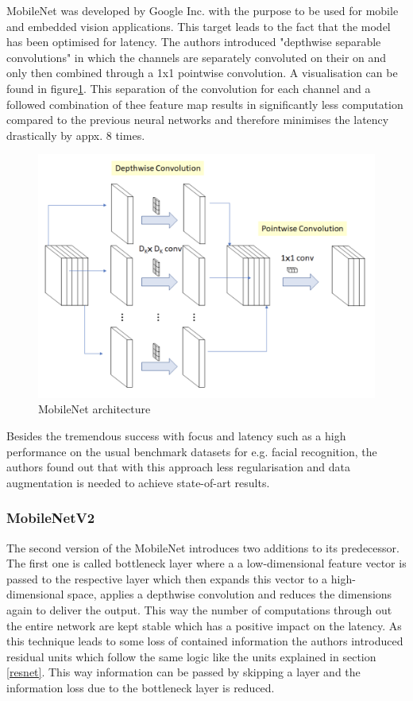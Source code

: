 MobileNet was developed by Google Inc. with the purpose to be used for mobile and embedded vision applications. This target leads to the fact that the model has been optimised for latency.
The authors introduced "depthwise separable convolutions" in which the channels are separately convoluted on their on and only then combined through a 1x1 pointwise convolution\cite{howard2017mobilenets}. A visualisation can be found in figure\ref{fig:mobilenet}. This separation of the convolution for each channel and a followed combination of thee feature map results in significantly less computation compared to the previous neural networks and therefore minimises the latency drastically by appx. 8 times\cite{howard2017mobilenets}.

\begin{figure}
  \centering
  \includegraphics[width=\linewidth]{figures/mobilenet.png}
  \caption{MobileNet architecture}
  \label{fig:mobilenet}
\end{figure}

Besides the tremendous success with focus and latency such as a high performance on the usual benchmark datasets for e.g. facial recognition, the authors found out that with this approach less regularisation and data augmentation is needed to achieve state-of-art results.

\subsubsection{MobileNetV2}
The second version of the MobileNet introduces two additions to its predecessor. The first one is called bottleneck layer where a a low-dimensional feature vector is passed to the respective layer which then expands this vector to a high-dimensional space, applies a depthwise convolution and reduces the dimensions again to deliver the output\cite{sandler2019mobilenetv2}. This way the number of computations through out the entire network are kept stable which has a positive impact on the latency. As this technique leads to some loss of contained information the authors introduced residual units which follow the same logic like the units explained in section \ref{resnet}. This way information can be passed by skipping a layer and the information loss due to the bottleneck layer is reduced.

